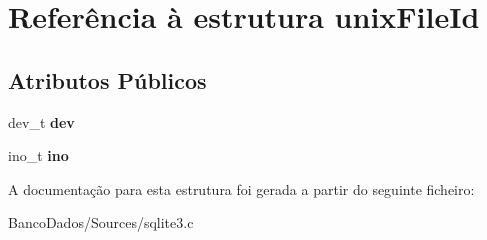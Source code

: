 \hypertarget{structunix_file_id}{\section{Referência à estrutura unix\-File\-Id}
\label{structunix_file_id}
}
\subsection*{Atributos Públicos}
\begin{DoxyCompactItemize}
\item 
\hypertarget{structunix_file_id_acf703d95b9a1ae2f34affb7e9ae45e1b}{dev\-\_\-t {\bfseries dev}}\label{structunix_file_id_acf703d95b9a1ae2f34affb7e9ae45e1b}

\item 
\hypertarget{structunix_file_id_a2cc2d43e9d3f0a60810daa8fc353e692}{ino\-\_\-t {\bfseries ino}}\label{structunix_file_id_a2cc2d43e9d3f0a60810daa8fc353e692}

\end{DoxyCompactItemize}


A documentação para esta estrutura foi gerada a partir do seguinte ficheiro\-:\begin{DoxyCompactItemize}
\item 
Banco\-Dados/\-Sources/sqlite3.\-c\end{DoxyCompactItemize}
